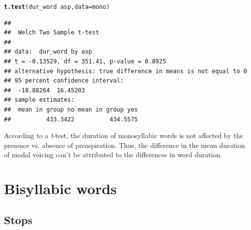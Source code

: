 \documentclass[a4paper,11pt]{article}\usepackage[]{graphicx}\usepackage[]{color}
\makeatletter
\newcommand{\hlopt}[1]{\textcolor[rgb]{0,0,0}{#1}}%
\newcommand{\hlstd}[1]{\textcolor[rgb]{0.345,0.345,0.345}{#1}}%
\newcommand{\hlkwc}[1]{\textcolor[rgb]{0.333,0.667,0.333}{#1}}%
\newcommand{\hlkwd}[1]{\textcolor[rgb]{0.737,0.353,0.396}{\textbf{#1}}}%
\newenvironment{kframe}{%
 \def\at@end@of@kframe{}%
 \ifinner\ifhmode%
  \def\at@end@of@kframe{\end{minipage}}%
  \begin{minipage}{\columnwidth}%
 \fi\fi%
 \def\FrameCommand##1{\hskip\@totalleftmargin \hskip-\fboxsep
 \colorbox{shadecolor}{##1}\hskip-\fboxsep
     \hskip-\linewidth \hskip-\@totalleftmargin \hskip\columnwidth}%
 \MakeFramed {\advance\hsize-\width
   \@totalleftmargin\z@ \linewidth\hsize
   \@setminipage}}%
 {\par\unskip\endMakeFramed%
 \at@end@of@kframe}
\newenvironment{knitrout}{}{} %
\makeatother
\begin{document}
\begin{knitrout}
\color{fgcolor}\begin{kframe}
\begin{alltt}
\hlkwd{t.test}\hlstd{(dur_word} \hlopt{~} \hlstd{asp,} \hlkwc{data} \hlstd{= mono)}
\end{alltt}
\begin{verbatim}
## 
## 	Welch Two Sample t-test
## 
## data:  dur_word by asp
## t = -0.13529, df = 351.41, p-value = 0.8925
## alternative hypothesis: true difference in means is not equal to 0
## 95 percent confidence interval:
##  -18.88264  16.45203
## sample estimates:
##  mean in group no mean in group yes 
##          433.3422          434.5575
\end{verbatim}
\end{kframe}
\end{knitrout}

According to a \textit{t}-test, the duration of monosyllabic words is not affected by the presence vs. absence of preaspiration.
Thus, the difference in the mean duration of modal voicing can't be attributed to the differences in word duration.

\section{Bisyllabic words}

\subsection{Stops}
\end{document}
